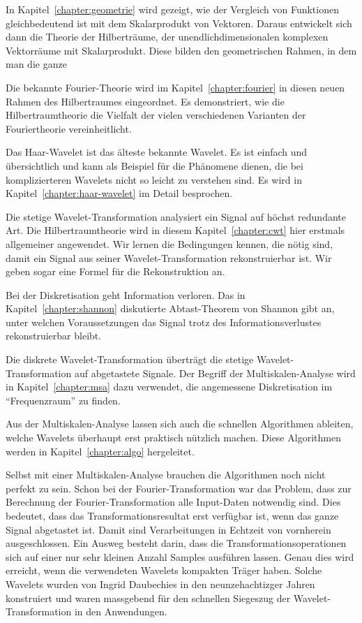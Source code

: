 In Kapitel~\ref{chapter:geometrie} wird gezeigt, wie der Vergleich
von Funktionen gleichbedeutend ist mit dem Skalarprodukt von Vektoren.
Daraus entwickelt sich dann die Theorie der Hilberträume, der
unendlichdimensionalen komplexen Vektorräume mit Skalarprodukt.
Diese bilden den geometrischen Rahmen, in dem man die ganze 

Die bekannte Fourier-Theorie wird im Kapitel~\ref{chapter:fourier} in
diesen neuen Rahmen des Hilbertraumes eingeordnet.
Es demonstriert, wie die Hilbertraumtheorie die Vielfalt der vielen
verschiedenen Varianten der Fouriertheorie vereinheitlicht.

Das Haar-Wavelet ist das älteste bekannte Wavelet.
Es ist einfach und übersichtlich und kann als Beispiel für die
Phänomene dienen, die bei komplizierteren Wavelets nicht so leicht
zu verstehen sind.
Es wird in Kapitel~\ref{chapter:haar-wavelet} im Detail besprochen.

Die stetige Wavelet-Transformation analysiert ein Signal auf höchst
redundante Art.
Die Hilbertraumtheorie wird in diesem Kapitel~\ref{chapter:cwt} hier
erstmals allgemeiner angewendet.
Wir lernen die Bedingungen kennen, die nötig sind, damit ein Signal
aus seiner Wavelet-Transformation rekonstruierbar ist.
Wir geben sogar eine Formel für die Rekonstruktion an.

Bei der Diskretisation geht Information verloren.
Das in Kapitel~\ref{chapter:shannon} diskutierte Abtast-Theorem
von Shannon gibt an, unter welchen Voraussetzungen das Signal trotz
des Informationsverlustes rekonstruierbar bleibt.

Die diskrete Wavelet-Transformation überträgt die stetige
Wavelet-Transformation auf abgetastete Signale.
Der Begriff der Multiskalen-Analyse wird in Kapitel~\ref{chapter:msa}
dazu verwendet, die angemessene Diskretisation im ``Frequenzraum''
zu finden.

Aus der Multiskalen-Analyse lassen sich auch die schnellen Algorithmen
ableiten, welche Wavelets überhaupt erst praktisch nützlich machen.
Diese Algorithmen werden in Kapitel~\ref{chapter:algo} hergeleitet.

Selbst mit einer Multiskalen-Analyse brauchen die Algorithmen noch nicht
perfekt zu sein.
Schon bei der Fourier-Transformation war das Problem, dass zur Berechnung
der Fourier-Transformation alle Input-Daten notwendig sind.
Dies bedeutet, dass das Transformationsresultat erst verfügbar ist,
wenn das ganze Signal abgetastet ist.
Damit sind Verarbeitungen in Echtzeit von vornherein ausgeschlossen.
Ein Ausweg besteht darin, dass die Transformationsoperationen sich auf
einer nur sehr kleinen Anzahl Samples ausführen lassen.
Genau dies wird erreicht, wenn die verwendeten Wavelets kompakten Träger
haben.
Solche Wavelets wurden von Ingrid Daubechies in den neunzehachtizger
Jahren konstruiert und waren massgebend für den schnellen Siegeszug 
der Wavelet-Transformation in den Anwendungen.

